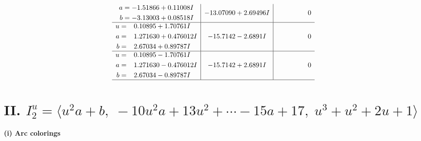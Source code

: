\documentclass[1p]{elsarticle_modified}
\theoremstyle{definition}
\begin{document}
$$\begin{array}{c|c|c}
\begin{aligned}
a &= -1.51866 + 0.11008 I \\
b &= -3.13003 + 0.08518 I\end{aligned}
 & -13.07090 + 2.69496 I & \phantom{-0.000000 } 0 \\ \hline\begin{aligned}
u &= \phantom{-}0.10895 + 1.70761 I \\
a &= \phantom{-}1.271630 + 0.476012 I \\
b &= \phantom{-}2.67034 + 0.89787 I\end{aligned}
 & -15.7142 - 2.6891 I & \phantom{-0.000000 } 0 \\ \hline\begin{aligned}
u &= \phantom{-}0.10895 - 1.70761 I \\
a &= \phantom{-}1.271630 - 0.476012 I \\
b &= \phantom{-}2.67034 - 0.89787 I\end{aligned}
 & -15.7142 + 2.6891 I & \phantom{-0.000000 } 0\\
 \hline 
 \end{array}$$\newpage\newpage\renewcommand{\arraystretch}{1}
\centering \section*{II. $I^u_{2}= \langle u^2 a+b,\;-10 u^2 a+13 u^2+\cdots-15 a+17,\;u^3+u^2+2 u+1 \rangle$}
\flushleft \textbf{(i) Arc colorings}\\
\end{document}

